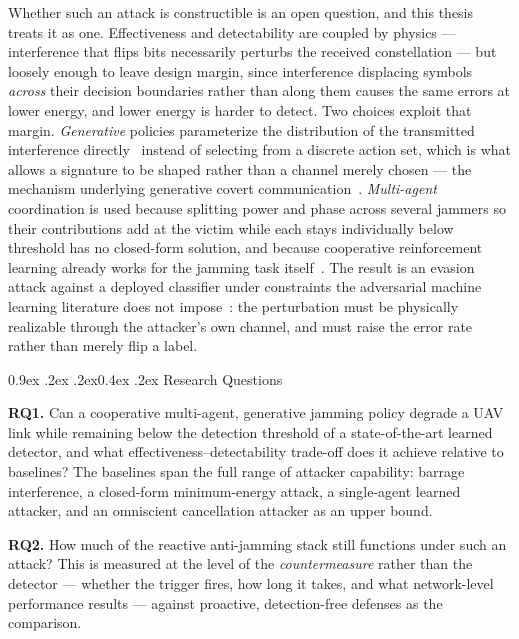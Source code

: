 \documentclass[10pt,a4paper]{article}
\makeatletter
\renewcommand\section{\@startsection{section}{1}{\z@}%
  {0.9ex \@plus .2ex \@minus .2ex}{0.4ex \@plus .2ex}%
  {\normalfont\large\bfseries}}
\makeatother
\begin{document}
Whether such an attack is constructible is an open question, and this thesis treats it as one.
Effectiveness and detectability are coupled by physics --- interference that flips bits
necessarily perturbs the received constellation --- but loosely enough to leave design margin,
since interference displacing symbols \emph{across} their decision boundaries rather than along
them causes the same errors at lower energy, and lower energy is harder to detect. Two choices
exploit that margin. \emph{Generative} policies parameterize the distribution of the transmitted
interference directly~\cite{goodfellow2014gan,durkan2019nsf} instead of selecting from a discrete
action set, which is what allows a signature to be shaped rather than a channel merely chosen ---
the mechanism underlying generative covert communication~\cite{wen2025generative}.
\emph{Multi-agent} coordination is used because splitting power and phase across several jammers
so their contributions add at the victim while each stays individually below threshold has no
closed-form solution, and because cooperative reinforcement learning already works for the
jamming task itself~\cite{valianti2024cooperative}. The result is an evasion attack against a
deployed classifier under constraints the adversarial machine learning literature does not
impose~\cite{sadeghi2019adversarial}: the perturbation must be physically realizable through the
attacker's own channel, and must raise the error rate rather than merely flip a label.

\section{Research Questions}

\textbf{RQ1.} Can a cooperative multi-agent, generative jamming policy degrade a UAV link while
remaining below the detection threshold of a state-of-the-art learned detector, and what
effectiveness--detectability trade-off does it achieve relative to baselines? The baselines span
the full range of attacker capability: barrage interference, a closed-form minimum-energy
attack, a single-agent learned attacker, and an omniscient cancellation attacker as an upper
bound.

\textbf{RQ2.} How much of the reactive anti-jamming stack still functions under such an attack?
This is measured at the level of the \emph{countermeasure} rather than the detector --- whether
the trigger fires, how long it takes, and what network-level performance results --- against
proactive, detection-free defenses as the comparison.
\end{document}
